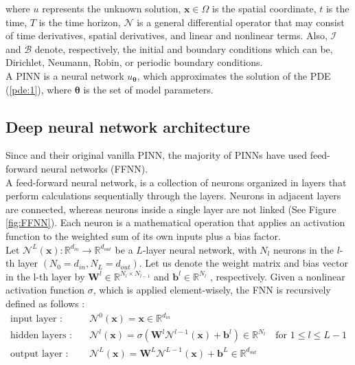 \documentclass[12pt,openany]{amsbook}
\newcommand{\bbm}[1]{{\mathbf{#1}}}
\begin{document}
where $u$ represents the unknown solution, $\bm x \in \Omega$ is the spatial coordinate, $t$ is the time, $T$ is the time horizon,
$\mathcal{N}$ is a general differential operator that may consist of time derivatives, spatial derivatives, 
and linear and nonlinear terms. Also, $\mathcal{I}$ and $\mathcal{B}$ denote, 
respectively, the initial and boundary conditions which can be, Dirichlet, Neumann, Robin, or periodic boundary conditions.\\

A PINN is a neural network $u_{\bm \theta}$, which approximates the solution of the PDE (\ref{pde:1}),
where $\bm \theta$ is the set of model parameters.

\subsection{Deep neural network architecture}

Since \cite{raissi2017physicsI} and their original vanilla PINN, the majority of PINNs have used feed-forward neural networks (FFNN).\\

A feed-forward neural network, is a collection of neurons organized in layers that perform calculations sequentially through the layers.
Neurons in adjacent layers are connected, whereas neurons inside a single layer are not linked (See Figure \ref{fig:FFNN}). Each
neuron is a mathematical operation that applies an activation function to the weighted sum of its own inputs plus a bias factor. \\

Let $\mathcal{N}^L(\bbm x) : \mathbb{R}^{d_{in}} \to \mathbb{R}^{d_{out}}$ be a $L$-layer neural network, with $N_l$ neurons in the $l$-th layer $(N_0 = d_{in}, N_L = d_{out})$. Let us
denote the weight matrix and bias vector in the l-th layer by $\bbm W^l \in \mathbb{R}^{N_l \times N_{l-1}}$ and
$\bbm b^l \in \mathbb{R}^{N_l}$ , respectively. Given a nonlinear activation function $\sigma$, which is applied
element-wisely, the FNN is recursively defined as follows :
\begin{align*}
\text {input layer :} & \quad \mathcal{N}^0(\bbm x) = \bbm x \in  \mathbb{R}^{d_{in}}\\
\text {hidden layers :} & \quad \mathcal{N}^l(\bbm x) = \sigma (\bbm W^l \mathcal{N}^{l-1}(\bbm x) + \bbm b^l)\in \mathbb{R}^{N_l} \quad \text{for } 1\leq l \leq L-1\\
\text {output layer :} & \quad \mathcal{N}^L(\bbm x) = \bbm W^L \mathcal{N}^{L-1}(\bbm x) + \bbm b^L \in \mathbb{R}^{d_{out}}
\end{align*}
\end{document}
